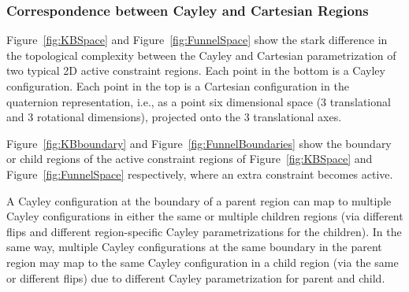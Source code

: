 \documentclass[]{article}
\newcommand{\figref}[1]{Figure~\ref{#1}}
\begin{document}
\subsubsection{Correspondence between Cayley and Cartesian Regions}
\label{sec:correspondanceCayleyCart}
\figref{fig:KBSpace} and \figref{fig:FunnelSpace} show the stark difference in
the topological complexity between the Cayley and Cartesian parametrization of
two typical 2D active constraint regions. Each point in the bottom is a Cayley
configuration. Each point in the top is a Cartesian configuration in the
quaternion representation, i.e., as a point six dimensional space (3
translational and 3 rotational dimensions), projected onto the 3 translational
axes. 

\figref{fig:KBboundary} and \figref{fig:FunnelBoundaries} show the boundary or
child regions of the active constraint regions of \figref{fig:KBSpace} and
\figref{fig:FunnelSpace} respectively, where an extra constraint becomes
active. 

A Cayley configuration at the boundary of a parent region can map to multiple
Cayley configurations in either the same or multiple children regions (via
different flips and different region-specific Cayley parametrizations for the
children). In the same way, multiple Cayley configurations at the same boundary
in the parent region may map to the same Cayley configuration in a child region
(via the same or different flips) due to different Cayley parametrization for
parent and child.
\end{document}

